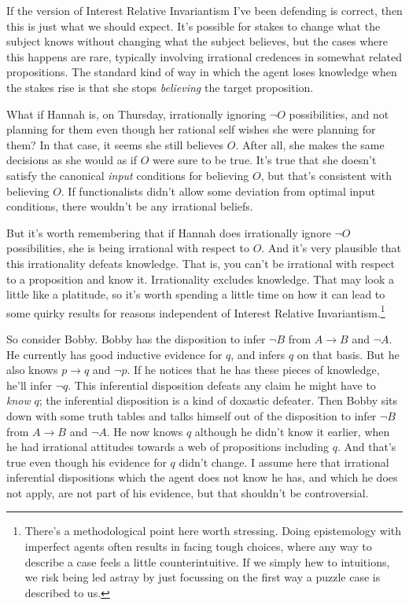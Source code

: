 If the version of Interest Relative Invariantism I've been defending is correct, then this is just what we should expect. It's possible for stakes to change what the subject knows without changing what the subject believes, but the cases where this happens are rare, typically involving irrational credences in somewhat related propositions. The standard kind of way in which the agent loses knowledge when the stakes rise is that she stops \textit{believing} the target proposition.

What if Hannah is, on Thursday, irrationally ignoring \(\neg O\) possibilities, and not planning for them even though her rational self wishes she were planning for them? In that case, it seems she still believes \(O\). After all, she makes the same decisions as she would as if \(O\) were sure to be true. It's true that she doesn't satisfy the canonical \textit{input} conditions for believing \(O\), but that's consistent with believing \(O\). If functionalists didn't allow some deviation from optimal input conditions, there wouldn't be any irrational beliefs.

But it's worth remembering that if Hannah does irrationally ignore \(\neg O\) possibilities, she is being irrational with respect to \(O\). And it's very plausible that this irrationality defeats knowledge. That is, you can't be irrational with respect to a proposition and know it. Irrationality excludes knowledge. That may look a little like a platitude, so it's worth spending a little time on how it can lead to some quirky results for reasons independent of Interest Relative Invariantism.\footnote{There's a methodological point here worth stressing. Doing epistemology with imperfect agents often results in facing tough choices, where any way to describe a case feels a little counterintuitive. If we simply hew to intuitions, we risk being led astray by just focussing on the first way a puzzle case is described to us.}

So consider Bobby. Bobby has the disposition to infer \(\neg B\) from \(A \rightarrow B\) and \(\neg A\). He currently has good inductive evidence for \(q\), and infers \(q\) on that basis. But he also knows \(p \rightarrow q\) and \(\neg p\). If he notices that he has these pieces of knowledge, he'll infer \(\neg q\). This inferential disposition defeats any claim he might have to \textit{know} \(q\); the inferential disposition is a kind of doxastic defeater. Then Bobby sits down with some truth tables and talks himself out of the disposition to infer \(\neg B\) from \(A \rightarrow B\) and \(\neg A\). He now knows \(q\) although he didn't know it earlier, when he had irrational attitudes towards a web of propositions including \(q\). And that's true even though his evidence for \(q\) didn't change. I assume here that irrational inferential dispositions which the agent does not know he has, and which he does not apply, are not part of his evidence, but that shouldn't be controversial.

